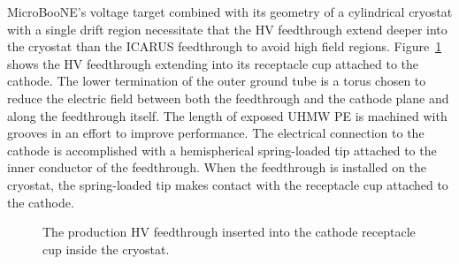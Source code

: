 
MicroBooNE's voltage target combined with its geometry of a cylindrical cryostat with a single drift region necessitate that the HV feedthrough extend deeper into the cryostat than the ICARUS feedthrough to avoid high field regions.  Figure~\ref{fig:hv-FT-cryostat} shows the HV feedthrough extending into its receptacle cup attached to the \lartpc cathode.  The lower termination of the outer ground tube is a torus chosen to reduce the electric field between both the feedthrough and the cathode plane and along the feedthrough itself.  The length of exposed UHMW PE is machined with grooves in an effort to improve performance.  The electrical connection to the cathode is accomplished with a hemispherical spring-loaded tip attached to the inner conductor of the feedthrough.  When the feedthrough is installed on the cryostat, the spring-loaded tip makes contact with the receptacle cup attached to the cathode.

\begin{figure}
\caption{The production HV feedthrough inserted into the cathode receptacle cup inside the cryostat.}
\label{fig:hv-FT-cryostat}
\end{figure}
